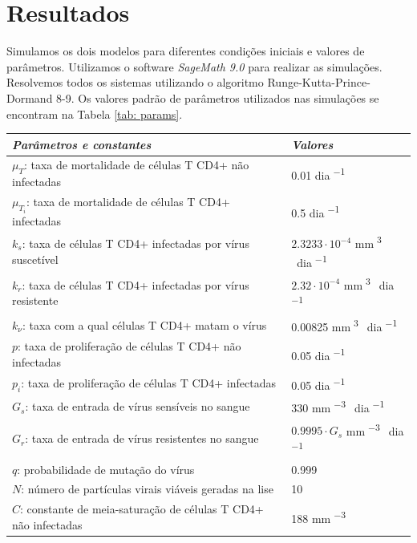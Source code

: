 \section{Resultados}


Simulamos os dois modelos para diferentes condições iniciais e valores de parâmetros.
Utilizamos o software \emph{SageMath 9.0} para realizar as simulações.
Resolvemos todos os sistemas utilizando o algoritmo Runge-Kutta-Prince-Dormand 8-9.
Os valores padrão de parâmetros utilizados nas simulações se encontram na Tabela \ref{tab: params}.

\begin{table}[ht!]
    \begin{center}
        \begin{tabular}{l l}
            \hline
            \emph{Parâmetros e constantes} & \emph{Valores} \\
            \hline
            \( \mu_{ T } \): taxa de mortalidade de células T CD4+ não infectadas & 0.01 \unit{dia^{ -1 }} \\
            \( \mu_{ T_{ i } } \): taxa de mortalidade de células T CD4+ infectadas & 0.5 \unit{dia^{ -1 }} \\
            \( k_{ s } \): taxa de células T CD4+ infectadas por vírus suscetível & \( 2.3233 \cdot 10^{ -4 } \) \unit{mm^{ 3 } dia^{ -1 }} \\
            \( k_{ r } \): taxa de células T CD4+ infectadas por vírus resistente & \( 2.32 \cdot 10^{ -4 } \) \unit{mm^{ 3 } dia^{ -1 }} \\
           \( k_{ \nu } \): taxa com a qual células T CD4+ matam o vírus & 0.00825 \unit{mm^{ 3 } dia^{ -1 }} \\
           \( p \): taxa de proliferação de células T CD4+ não infectadas & 0.05 \unit{dia^{ -1 }} \\
           \( p_{ i } \): taxa de proliferação de células T CD4+ infectadas & 0.05 \unit{dia^{ -1 }} \\
           \( G_{ s } \): taxa de entrada de vírus sensíveis no sangue & 330 \unit{mm^{ -3 } dia^{ -1 }} \\
           \( G_{ r } \): taxa de entrada de vírus resistentes no sangue & \( 0.9995 \cdot G_{ s } \) \unit{mm^{ -3 } dia^{ -1 }} \\
           \( q \): probabilidade de mutação do vírus & 0.999 \\
           \( N \): número de partículas virais viáveis geradas na lise & 10 \\
           \( C \): constante de meia-saturação de células T CD4+ não infectadas & 188 \unit{mm^{ -3 }} \\

\end{tabular}
\end{center}
\end{table}
